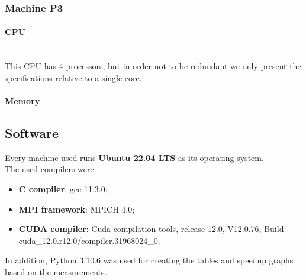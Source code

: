 \subsubsection{Machine P3}
\paragraph{CPU}\mbox{}\\
This CPU has 4 processors, but in order not to be redundant we only present the specifications relative to a single core.
{\fontsize{9}{10}\selectfont }
\paragraph{Memory}
{\fontsize{9}{10}\selectfont }

\subsection{Software}
\noindent Every machine used runs \textbf{Ubuntu 22.04 LTS} as its operating system. \\The used compilers were:
\begin{itemize}
    \item \textbf{C compiler}: gcc 11.3.0;
    \item \textbf{MPI framework}: MPICH 4.0;
    \item \textbf{CUDA compiler}: Cuda compilation tools, release 12.0, V12.0.76, Build cuda\_12.0.r12.0/compiler.31968024\_0.
\end{itemize}
In addition, Python 3.10.6 was used for creating the tables and speedup graphs based on the measurements.